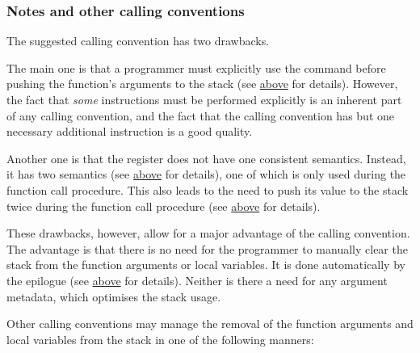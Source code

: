 \subsubsection{Notes and other calling conventions}

\vspace{-0.2cm}

The suggested calling convention has two drawbacks.

The main one is that a programmer must explicitly use the  command
before pushing the function's arguments to the stack
(see \hyperlink{functions:cmd:prc}{above} for details).
However, the fact that \textit{some} instructions must be performed explicitly
is an inherent part of any calling convention, and the fact that the 
calling convention has but one necessary additional instruction is a good
quality.

Another one is that the  register does not have one consistent semantics.
Instead, it has two semantics (see \hyperlink{r13}{above} for details),
one of which is only used during the function call procedure.
This also leads to the need to push its value to the stack twice
during the function call procedure (see
\hyperlink{functions:call}{above} for details).

These drawbacks, however, allow for a major advantage of the  calling
convention.
The advantage is that there is no need for the programmer to manually clear
the stack from the function arguments or local variables.
It is done automatically by the epilogue
(see \hyperlink{functions:return}{above} for details).
Neither is there a need for any argument metadata, which optimises the stack
usage.

Other calling conventions may manage the removal of the function arguments
and local variables from the stack in one of the following manners:

